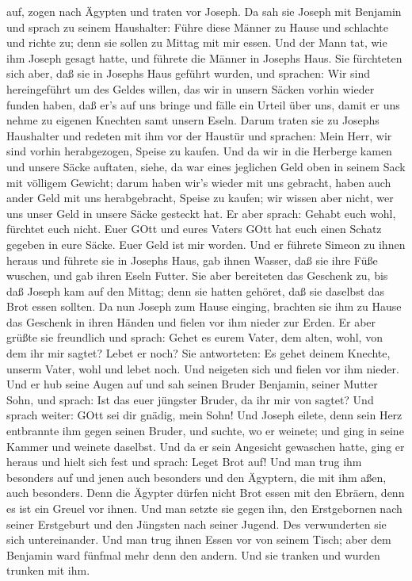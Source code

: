 auf, zogen nach Ägypten und traten vor Joseph.  Da sah sie
Joseph mit Benjamin und sprach zu seinem Haushalter: Führe diese Männer
zu Hause und schlachte und richte zu; denn sie sollen zu Mittag mit mir
essen.  Und der Mann tat, wie ihm Joseph gesagt hatte, und
führete die Männer in Josephs Haus.  Sie fürchteten sich
aber, daß sie in Josephs Haus geführt wurden, und sprachen: Wir sind
hereingeführt um des Geldes willen, das wir in unsern Säcken vorhin
wieder funden haben, daß er's auf uns bringe und fälle ein Urteil über
uns, damit er uns nehme zu eigenen Knechten samt unsern Eseln.
 Darum traten sie zu Josephs Haushalter und redeten mit ihm
vor der Haustür  und sprachen: Mein Herr, wir sind vorhin
herabgezogen, Speise zu kaufen.  Und da wir in die Herberge
kamen und unsere Säcke auftaten, siehe, da war eines jeglichen Geld oben
in seinem Sack mit völligem Gewicht; darum haben wir's wieder mit uns
gebracht,  haben auch ander Geld mit uns herabgebracht,
Speise zu kaufen; wir wissen aber nicht, wer uns unser Geld in unsere
Säcke gesteckt hat.  Er aber sprach: Gehabt euch wohl,
fürchtet euch nicht. Euer GOtt und eures Vaters GOtt hat euch einen
Schatz gegeben in eure Säcke. Euer Geld ist mir worden. Und er führete
Simeon zu ihnen heraus  und führete sie in Josephs Haus,
gab ihnen Wasser, daß sie ihre Füße wuschen, und gab ihren Eseln Futter.
 Sie aber bereiteten das Geschenk zu, bis daß Joseph kam
auf den Mittag; denn sie hatten gehöret, daß sie daselbst das Brot essen
sollten.  Da nun Joseph zum Hause einging, brachten sie ihm
zu Hause das Geschenk in ihren Händen und fielen vor ihm nieder zur
Erden.  Er aber grüßte sie freundlich und sprach: Gehet es
eurem Vater, dem alten, wohl, von dem ihr mir sagtet? Lebet er noch?
 Sie antworteten: Es gehet deinem Knechte, unserm Vater,
wohl und lebet noch. Und neigeten sich und fielen vor ihm nieder.
 Und er hub seine Augen auf und sah seinen Bruder Benjamin,
seiner Mutter Sohn, und sprach: Ist das euer jüngster Bruder, da ihr mir
von sagtet? Und sprach weiter: GOtt sei dir gnädig, mein Sohn!
 Und Joseph eilete, denn sein Herz entbrannte ihm gegen
seinen Bruder, und suchte, wo er weinete; und ging in seine Kammer und
weinete daselbst.  Und da er sein Angesicht gewaschen
hatte, ging er heraus und hielt sich fest und sprach: Leget Brot auf!
 Und man trug ihm besonders auf und jenen auch besonders
und den Ägyptern, die mit ihm aßen, auch besonders. Denn die Ägypter
dürfen nicht Brot essen mit den Ebräern, denn es ist ein Greuel vor
ihnen.  Und man setzte sie gegen ihn, den Erstgebornen nach
seiner Erstgeburt und den Jüngsten nach seiner Jugend. Des verwunderten
sie sich untereinander.  Und man trug ihnen Essen vor von
seinem Tisch; aber dem Benjamin ward fünfmal mehr denn den andern. Und
sie tranken und wurden trunken mit ihm.

